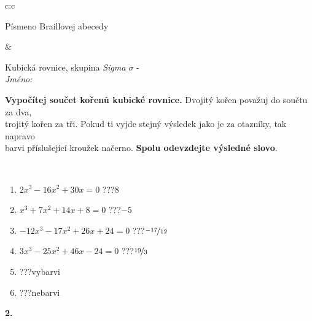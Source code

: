 \documentclass[10pt]{report}
\begin{document}
\begin{tabular}{c:c}
\begin{minipage}[c][104.5mm][t]{0.5\linewidth}
\begin{center}
\begin{minipage}{0.20\linewidth}
\begin{center}
{\small Písmeno Braillovej abecedy}
\end{center}
\end{minipage}
\end{center}
\end{minipage}
&
\begin{minipage}[c][104.5mm][t]{0.5\linewidth}
\begin{center}
\vspace{7mm}
{\huge Kubická rovnice, skupina \textit{Sigma $\sigma$} -}\\[5mm]
\textit{Jméno:}\phantom{xxxxxxxxxxxxxxxxxxxxxxxxxxxxxxxxxxxxxxxxxxxxxxxxxxxxxxxxxxxxxxxxx}\\[5mm]
\begin{minipage}{0.95\linewidth}
\begin{center}
\textbf{Vypočítej součet kořenů kubické rovnice.} Dvojitý kořen považuj do součtu za dva,\\trojitý kořen za tři. Pokud ti vyjde stejný výsledek jako je za otazníky, tak napravo\\barvi příslušející kroužek načerno. \textbf{Spolu odevzdejte výsledné slovo}.
\end{center}
\end{minipage}
\\[1mm]
\begin{minipage}{0.79\linewidth}
\begin{center}
\begin{varwidth}{\linewidth}
\begin{enumerate}
\Large
\item $2x^3-16x^2+30x=0$\quad \dotfill\; ???\;\dotfill \quad $8$
\item $x^3+7x^2+14x+8=0$\quad \dotfill\; ???\;\dotfill \quad $-5$
\item $-12x^3-17x^2+26x+24=0$\quad \dotfill\; ???\;\dotfill \quad $\nicefrac{-17}{12}$
\item $3x^3-25x^2+46x-24=0$\quad \dotfill\; ???\;\dotfill \quad $\nicefrac{19}{3}$
\item \quad \dotfill\; ???\;\dotfill \quad vybarvi
\item \quad \dotfill\; ???\;\dotfill \quad nebarvi
\end{enumerate}
\end{varwidth}
\end{center}
\end{minipage}
\begin{minipage}{0.20\linewidth}
\begin{center}
{\Huge\bfseries 2.} \\[2mm]

\end{center}
\end{minipage}
\end{center}
\end{minipage}
\end{tabular}
\end{document}
